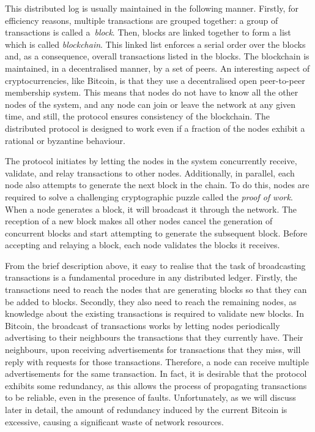 \documentclass{dads}   %
\begin{document}
This distributed log is usually maintained in the following manner.  Firstly, for efficiency reasons, multiple transactions are grouped together: a group of transactions is called a~\textsl{block}. Then, blocks are linked together to form a list which is called \textit{blockchain}. This linked list enforces a serial order over the blocks and, as a consequence, overall transactions listed in the blocks. The blockchain is maintained, in a decentralised manner, by a set of peers. An interesting aspect of cryptocurrencies, like Bitcoin, is that they use a decentralised open peer-to-peer membership system. This means that nodes do not have to know all the other nodes of the system, and any node can join or leave the network at any given time, and still, the protocol ensures consistency of the blockchain. The distributed protocol is designed to work even if a fraction of the nodes exhibit a rational or byzantine behaviour.

The protocol initiates by letting the nodes in the system concurrently receive, validate, and relay transactions to other nodes. Additionally, in parallel, each node also attempts to generate the next block in the chain. To do this,  nodes are required to solve a challenging cryptographic puzzle called the \textit{proof of work}. When a node generates a block, it will broadcast it through the network. The reception of a new block makes all other nodes cancel the generation of concurrent blocks and start attempting to generate the subsequent block. Before accepting and relaying a block, each node validates the blocks it receives.

From the brief description above, it easy to realise that the task of broadcasting transactions is a fundamental procedure in any distributed ledger. Firstly, the transactions need to reach the nodes that are generating blocks so that they can be added to blocks. Secondly, they also need to reach the remaining nodes, as knowledge about the existing transactions is required to validate new blocks. In Bitcoin, the broadcast of transactions works by letting nodes periodically advertising to their neighbours the transactions that they currently have. Their neighbours, upon receiving advertisements for transactions that they miss, will reply with requests for those transactions. Therefore, a node can receive multiple advertisements for the same transaction. In fact, it is desirable that the protocol exhibits some redundancy, as this allows the process of propagating transactions to be reliable, even in the presence of faults. Unfortunately, as we will discuss later in detail, the amount of redundancy induced by the current Bitcoin is excessive, causing a significant waste of network resources.
\end{document}
